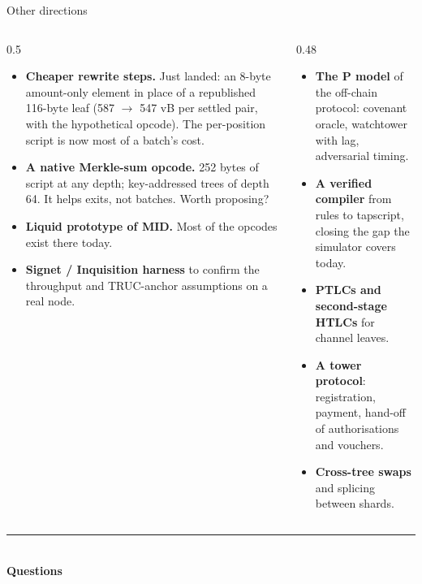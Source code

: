 \documentclass[aspectratio=169,10pt]{beamer}
\begin{document}
\begin{frame}{Other directions}
  \begin{columns}[T]
    \begin{column}{0.5\textwidth}
      \begin{itemize}
        \item \textbf{Cheaper rewrite steps.} Just landed: an 8-byte amount-only element in place of a republished 116-byte leaf (587 $\to$ 547 vB per settled pair, with the hypothetical opcode). The per-position script is now most of a batch's cost.
        \item \textbf{A native Merkle-sum opcode.} 252 bytes of script at any depth; key-addressed trees of depth 64. It helps exits, not batches. Worth proposing?
        \item \textbf{Liquid prototype of MID.} Most of the opcodes exist there today.
        \item \textbf{Signet / Inquisition harness} to confirm the throughput and TRUC-anchor assumptions on a real node.
      \end{itemize}
    \end{column}
    \begin{column}{0.48\textwidth}
      \begin{itemize}
        \item \textbf{The P model} of the off-chain protocol: covenant oracle, watchtower with lag, adversarial timing.
        \item \textbf{A verified compiler} from rules to tapscript, closing the gap the simulator covers today.
        \item \textbf{PTLCs and second-stage HTLCs} for channel leaves.
        \item \textbf{A tower protocol}: registration, payment, hand-off of authorisations and vouchers.
        \item \textbf{Cross-tree swaps} and splicing between shards.
      \end{itemize}
    \end{column}
  \end{columns}
\end{frame}

\begin{frame}[plain]
  \centering
  \vfill
  {\color{ltaccent}\rule{2cm}{2pt}}\\[0.6em]
  {\Huge\bfseries Questions}\\[1em]
  \vfill
\end{frame}
\end{document}
